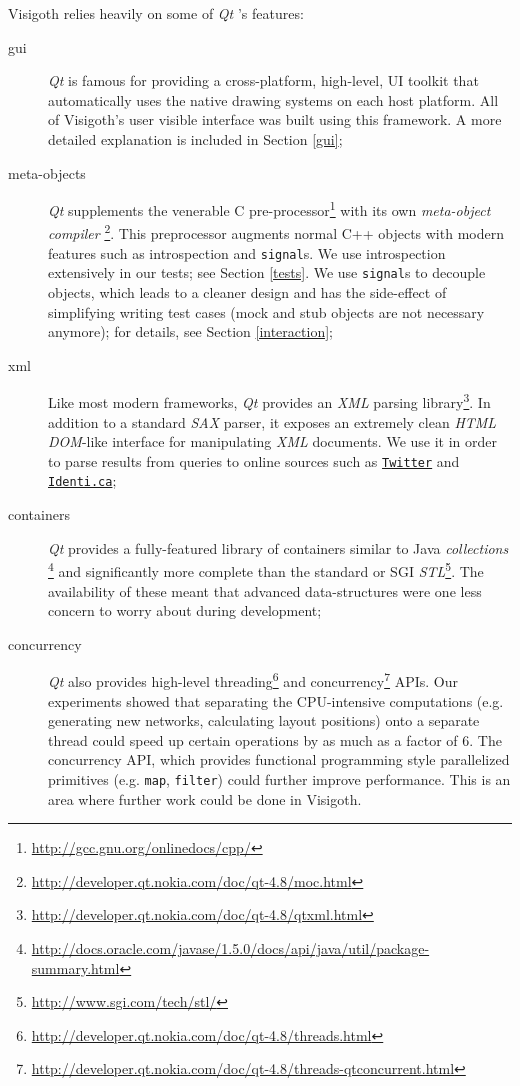 \documentclass[a4paper,11pt,titlepage]{article}
\let\stdhref\href
\renewcommand{\href}[2]{\stdhref{#1}{\texttt{#2}}}
\newcommand{\code}[1]{\texttt{#1}}
\newcommand{\buzz}[1]{\emph{#1}}
\newcommand{\Qt}{\buzz{Qt} }
\begin{document}
Visigoth relies heavily on some of \Qt's features:
\begin{description}
\item [gui] \Qt is famous for providing a cross-platform, high-level,
  UI toolkit that automatically uses the native drawing systems on
  each host platform. All of Visigoth's user visible interface was
  built using this framework. A more detailed explanation is included
  in Section \ref{gui};
\item [meta-objects] \Qt supplements the venerable C
  pre-processor\footnote{\url{http://gcc.gnu.org/onlinedocs/cpp/}}
  with its own \buzz{meta-object
    compiler} \footnote{\url{http://developer.qt.nokia.com/doc/qt-4.8/moc.html}}.
  This preprocessor augments normal C++ objects with modern features
  such as introspection and \code{signal}s. We use introspection
  extensively in our tests; see Section \ref{tests}. We use
  \code{signal}s to decouple objects, which leads to a cleaner design
  and has the side-effect of simplifying writing test cases (mock and
  stub objects are not necessary anymore); for details, see Section
  \ref{interaction};
\item [xml] Like most modern frameworks, \Qt provides an \buzz{XML}
  parsing
  library\footnote{\url{http://developer.qt.nokia.com/doc/qt-4.8/qtxml.html}}.
  In addition to a standard \buzz{SAX} parser, it exposes an extremely
  clean \buzz{HTML DOM}-like interface for manipulating \buzz{XML}
  documents. We use it in order to parse results from queries to
  online sources such as \href{http://twitter.com}{Twitter} and
  \href{http://identi.ca}{Identi.ca};
\item [containers] \Qt provides a fully-featured library of containers
  similar to Java
  \buzz{collections} \footnote{\url{http://docs.oracle.com/javase/1.5.0/docs/api/java/util/package-summary.html}}
  and significantly more complete than the standard or SGI
  \buzz{STL}\footnote{\url{http://www.sgi.com/tech/stl/}}. The
  availability of these meant that advanced data-structures were one
  less concern to worry about during development;
\item [concurrency] \Qt also provides high-level
  threading\footnote{\url{http://developer.qt.nokia.com/doc/qt-4.8/threads.html}}
  and
  concurrency\footnote{\url{http://developer.qt.nokia.com/doc/qt-4.8/threads-qtconcurrent.html}}
  APIs. Our experiments showed that separating the CPU-intensive
  computations (e.g. generating new networks, calculating layout
  positions) onto a separate thread could speed up certain operations
  by as much as a factor of $6$. The concurrency API, which provides
  functional programming style parallelized primitives
  (e.g. \code{map}, \code{filter}) could further improve performance.
  This is an area where further work could be done in Visigoth.
\end{description}
\end{document}

